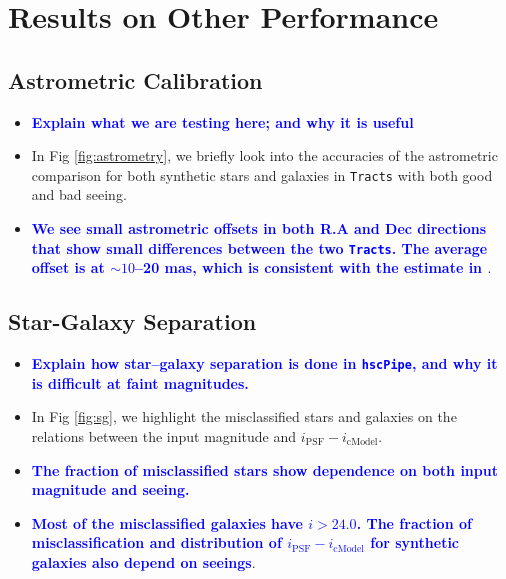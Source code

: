 \documentclass[useamsfonts]{pasj01}
\def\hscpipe{\texttt{hscPipe}}
\def\tracts{\texttt{Tracts}}
\newcommand{\plan}[1]{\textcolor{blue} {\textbf{#1}}}
\begin{document}

\section{Results on Other Performance}
    \label{sec:others}

\subsection{Astrometric Calibration}
    \label{ssec:astrometry}

    \begin{itemize}

        \item \plan{Explain what we are testing here; and why it is useful}

        \item In Fig \ref{fig:astrometry}, we briefly look into the accuracies
            of the astrometric comparison for both synthetic stars and galaxies in
            \tracts{} with both good and bad seeing.

        \item \plan{We see small astrometric offsets in both R.A and Dec directions
            that show small differences between the two \tracts{}.
            The average offset is at ${\sim}10$--20 mas, which is consistent with
            the estimate in \citet{HSCDR1}}.

    \end{itemize}

\subsection{Star-Galaxy Separation}
    \label{ssec:sg}

    \begin{itemize}

        \item \plan{Explain how star--galaxy separation is done in \hscpipe{}, and
            why it is difficult at faint magnitudes.}

        \item In Fig \ref{fig:sg}, we highlight the misclassified stars and galaxies
            on the relations between the input magnitude and
            $i_{\mathrm{PSF}}-i_{\mathrm{cModel}}$.

        \item \plan{The fraction of misclassified stars show dependence on both
            input magnitude and seeing.}

        \item \plan{Most of the misclassified galaxies have $i > 24.0$.
            The fraction of misclassification and distribution of
            $i_{\mathrm{PSF}}-i_{\mathrm{cModel}}$ for synthetic galaxies also depend on
            seeings}.

    \end{itemize}
\end{document}
